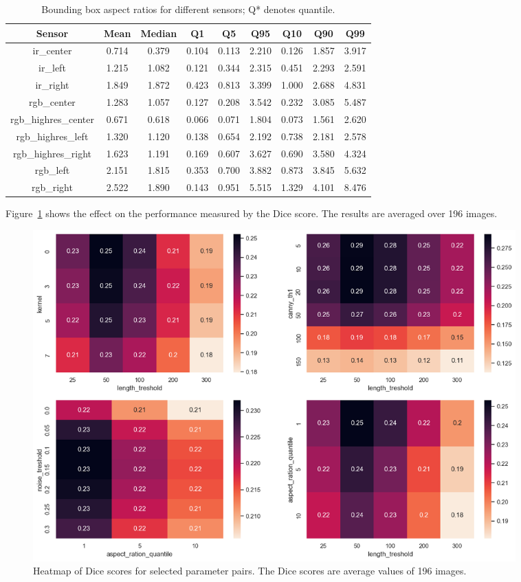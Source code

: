 \documentclass[Master,MDS,english]{BASE/twbook} %
\begin{document}
\begin{table}[ht]
\centering
\footnotesize
\begin{tabular}{|c|S[table-format=1.3]|S[table-format=1.3]|S[table-format=1.3]|S[table-format=1.3]|S[table-format=1.3]|S[table-format=1.3]|S[table-format=1.3]|S[table-format=1.3]|}
\hline
\textbf{Sensor} & \textbf{Mean} & \textbf{Median} & \textbf{Q1} & \textbf{Q5} & \textbf{Q95} & \textbf{Q10} & \textbf{Q90} & \textbf{Q99} \\
\hline
ir\_center & 0.714 & 0.379 & 0.104 & 0.113 & 2.210 & 0.126 & 1.857 & 3.917 \\
ir\_left & 1.215 & 1.082 & 0.121 & 0.344 & 2.315 & 0.451 & 2.293 & 2.591 \\
ir\_right & 1.849 & 1.872 & 0.423 & 0.813 & 3.399 & 1.000 & 2.688 & 4.831 \\
rgb\_center & 1.283 & 1.057 & 0.127 & 0.208 & 3.542 & 0.232 & 3.085 & 5.487 \\
rgb\_highres\_center & 0.671 & 0.618 & 0.066 & 0.071 & 1.804 & 0.073 & 1.561 & 2.620 \\
rgb\_highres\_left & 1.320 & 1.120 & 0.138 & 0.654 & 2.192 & 0.738 & 2.181 & 2.578 \\
rgb\_highres\_right & 1.623 & 1.191 & 0.169 & 0.607 & 3.627 & 0.690 & 3.580 & 4.324 \\
rgb\_left & 2.151 & 1.815 & 0.353 & 0.700 & 3.882 & 0.873 & 3.845 & 5.632 \\
rgb\_right & 2.522 & 1.890 & 0.143 & 0.951 & 5.515 & 1.329 & 4.101 & 8.476 \\
\hline
\end{tabular}
\caption{Bounding box aspect ratios for different sensors; Q* denotes quantile.}
\label{tab:sensor_stats}
\end{table}


Figure~\ref{fig:fld_params} shows the effect on the performance measured by the Dice score. The results are averaged over 196 images. 

\begin{figure}[h]
\centering
\includegraphics[width=0.9\textwidth]{images/fld/parameter_tuning}
\caption{Heatmap of Dice scores for selected parameter pairs. The Dice scores are average values of 196 images. }
\label{fig:fld_params}
\end{figure}
\end{document}
